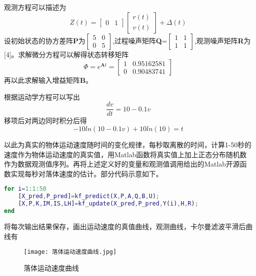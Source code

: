 \documentclass{ctexart}
\begin{document}
观测方程可以描述为
\begin{equation*}
Z(t)=\begin{bmatrix}
0&1
\end{bmatrix}\begin{bmatrix}
r(t)\\
v(t)
\end{bmatrix}+\Delta(t)
\end{equation*}
\vspace{1cm}
设初始状态的协方差阵$\bm{P}$为$\left[\begin{array}{cc}
5&0\\
0&5
\end{array}\right]$,过程噪声矩阵\textbf{Q}=$\left[\begin{array}{cc}
1&1\\
1&1
\end{array}\right]$,观测噪声矩阵\textbf{R}为[4]。求解微分方程可以解得状态转移矩阵
\begin{equation*}
\bm{\varPhi}=e^{\bm{A}t}=\begin{bmatrix}
  1&0.95162581\\
  0&0.90483741
\end{bmatrix}
\end{equation*}
再以此求解输入增益矩阵\textbf{B}。

\vspace{2cm}
根据运动学方程可以写出
\begin{equation*}
\dfrac{dv}{dt}=10-0.1v
\end{equation*}
移项后对两边同时积分后得
\begin{equation*}
-10ln(10-0.1v)+10ln(10)=t
\end{equation*}

以此为真实的物体运动速度随时间的变化规律，每秒取离散的时间，计算1-50秒的速度作为物体运动速度的真实值，用Matlab函数将真实值上加上正态分布随机数作为数据观测值序列。再将上述定义好的变量和观测值调用给出的Matlab开源函数实现每秒对落体速度的估计。部分代码示意如下。
\begin{lstlisting}[language=Matlab]
for i=1:1:50
    [X_pred,P_pred]=kf_predict(X,P,A,Q,B,U);
    [X,P,K,IM,IS,LH]=kf_update(X_pred,P_pred,Y(i),H,R);
end
\end{lstlisting}
\newpage
将每次输出结果保存，画出运动速度的真值曲线，观测曲线，卡尔曼滤波平滑后曲线有
\begin{figure}[H]
\texttt{[image: 落体运动速度曲线.jpg]}
\caption{落体运动速度曲线}
\end{figure}
\end{document}
